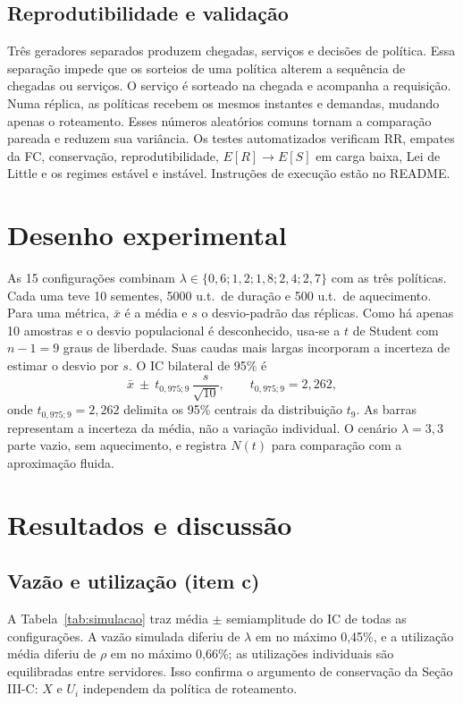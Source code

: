 \documentclass[conference,a4paper]{IEEEtran}
\begin{document}
\subsection{Reprodutibilidade e validação}

Três geradores separados produzem chegadas, serviços e decisões de política.
Essa separação impede que os sorteios de uma política alterem a sequência de
chegadas ou serviços. O serviço é sorteado na chegada e acompanha a
requisição. Numa réplica, as políticas
recebem os mesmos instantes e demandas, mudando apenas o roteamento. Esses
números aleatórios comuns tornam a comparação pareada e reduzem sua
variância. Os testes automatizados verificam RR, empates da FC,
conservação, reprodutibilidade, $E[R]\to E[S]$ em carga baixa, Lei de Little
e os regimes estável e instável. Instruções de execução estão no README.

\section{Desenho experimental}

As 15 configurações combinam
$\lambda\in\{0{,}6;1{,}2;1{,}8;2{,}4;2{,}7\}$ com as três políticas. Cada
uma teve 10 sementes, 5000 u.t.\ de duração e 500 u.t.\ de aquecimento. Para uma
métrica, $\bar{x}$ é a média e $s$ o desvio-padrão das réplicas. Como há
apenas 10 amostras e o desvio populacional é desconhecido, usa-se a
$t$ de Student com $n-1=9$ graus de liberdade. Suas caudas mais largas
incorporam a incerteza de estimar o desvio por $s$. O IC
bilateral de 95\% é
\begin{equation}
 \bar{x}\ \pm\ t_{0{,}975;9}\,\frac{s}{\sqrt{10}},
 \qquad t_{0{,}975;9}=2{,}262,
 \label{eq:ic}
\end{equation}
onde $t_{0{,}975;9}=2{,}262$ delimita os 95\% centrais da distribuição
$t_9$. As barras representam a incerteza da média, não a variação
individual. O cenário $\lambda=3{,}3$ parte vazio, sem aquecimento, e registra
$N(t)$ para comparação com a aproximação fluida.

\section{Resultados e discussão}

\subsection{Vazão e utilização (item c)}

A Tabela~\ref{tab:simulacao} traz média $\pm$ semiamplitude do IC de todas
as configurações. A vazão simulada diferiu de $\lambda$ em no máximo
0,45\%, e a utilização média diferiu de $\rho$ em no máximo 0,66\%; as
utilizações individuais são equilibradas entre servidores. Isso confirma o
argumento de conservação da Seção III-C: $X$ e $U_i$ independem da política
de roteamento.
\end{document}
